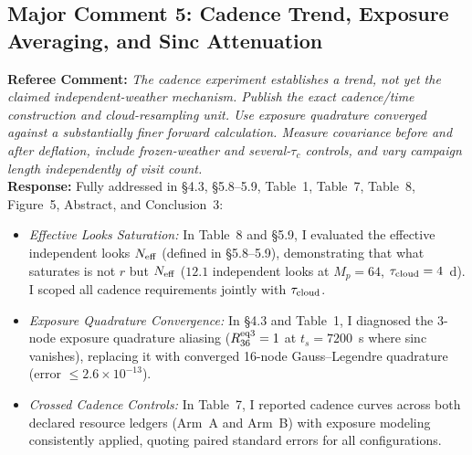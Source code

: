 \documentclass[11pt]{article}
\begin{document}
\subsection*{Major Comment 5: Cadence Trend, Exposure Averaging, and Sinc Attenuation}
\textbf{Referee Comment:} \textit{The cadence experiment establishes a trend, not yet the claimed independent-weather mechanism. Publish the exact cadence/time construction and cloud-resampling unit. Use exposure quadrature converged against a substantially finer forward calculation. Measure covariance before and after deflation, include frozen-weather and several-$\tau_c$ controls, and vary campaign length independently of visit count.}\\
\textbf{Response:} Fully addressed in §4.3, §5.8--5.9, Table~1, Table~7, Table~8, Figure~5, Abstract, and Conclusion~3:
\begin{itemize}
    \item \textit{Effective Looks Saturation:} In Table~8 and §5.9, I evaluated the effective independent looks $N_{\rm eff}$ (defined in §5.8--5.9), demonstrating that what saturates is not $r$ but $N_{\rm eff}$ ($12.1$ independent looks at $M_p=64$, $\tau_{\rm cloud}=4$~d). I scoped all cadence requirements jointly with $\tau_{\rm cloud}$.
    \item \textit{Exposure Quadrature Convergence:} In §4.3 and Table~1, I diagnosed the 3-node exposure quadrature aliasing ($R_{36}^{\rm eq3}=1$ at $t_s=7200$~s where sinc vanishes), replacing it with converged 16-node Gauss--Legendre quadrature (error $\le 2.6\times 10^{-13}$).
    \item \textit{Crossed Cadence Controls:} In Table~7, I reported cadence curves across both declared resource ledgers (Arm~A and Arm~B) with exposure modeling consistently applied, quoting paired standard errors for all configurations.
\end{itemize}
\end{document}
